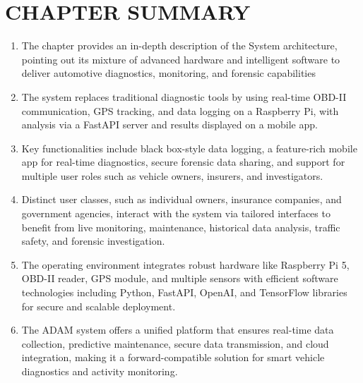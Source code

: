 \section{CHAPTER SUMMARY}
    \begin{enumerate}
        \item The chapter provides an in-depth description of the System architecture, pointing out its mixture of advanced hardware and intelligent software to deliver automotive diagnostics, monitoring, and forensic capabilities
        \item The system replaces traditional diagnostic tools by using real-time OBD-II communication, GPS tracking, and data logging on a Raspberry Pi, with analysis via a FastAPI server and results displayed on a mobile app.
        \item Key functionalities include black box-style data logging, a feature-rich mobile app for real-time diagnostics, secure forensic data sharing, and support for multiple user roles such as vehicle owners, insurers, and investigators.
        \item Distinct user classes, such as individual owners, insurance companies, and government agencies, interact with the system via tailored interfaces to benefit from live monitoring, maintenance, historical data analysis, traffic safety, and forensic investigation.
        \item The operating environment integrates robust hardware like Raspberry Pi 5, OBD-II reader, GPS module, and multiple sensors with efficient software technologies including Python, FastAPI, OpenAI, and TensorFlow libraries for secure and scalable deployment.
        \item The ADAM system offers a unified platform that ensures real-time data collection, predictive maintenance, secure data transmission, and cloud integration, making it a forward-compatible solution for smart vehicle diagnostics and activity monitoring.
    \end{enumerate}
